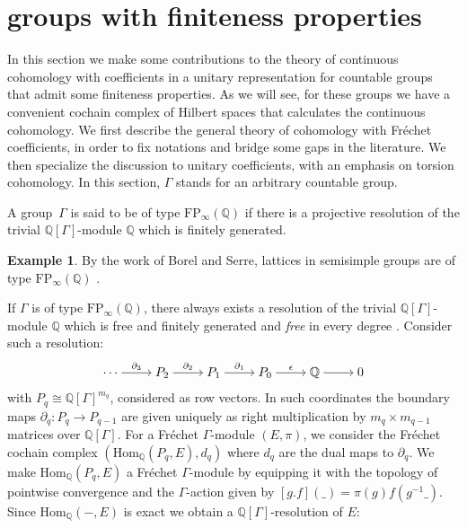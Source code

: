 \documentclass[12pt,reqno]{amsart}
\newcommand{\Q}{\mathbb{Q}}
\theoremstyle{definition}
\newtheorem{example}[theorem]{Example}
\begin{document}
\section{groups with finiteness properties}\label{sec3}
 In this section we make some contributions to the theory of continuous cohomology with coefficients in a unitary representation for countable groups that admit some finiteness properties. As we will see, for these groups we have a convenient cochain complex of Hilbert spaces that calculates the continuous cohomology. We first describe the general theory of cohomology with Fr\'echet coefficients, in order to fix notations and bridge some gaps in the literature. We then specialize the discussion to unitary coefficients, with an emphasis on torsion cohomology. In this section, $\Gamma$ stands for an arbitrary countable group.
 
    A group~$\Gamma$ is said to be of type $\mathrm{FP}_\infty(\mathbb{Q})$ if there is a projective resolution of the trivial $\mathbb{Q}[\Gamma]$-module $\mathbb{Q}$ which is finitely generated.


\begin{example}\label{ex:lattices finite type}
    By the work of Borel and Serre, lattices in semisimple groups are of type $\mathrm{FP_\infty(\Q)}$ \cite{borel+serre}. 
\end{example}

If $\Gamma$ is of type $\mathrm{FP}_\infty(\mathbb{Q})$, there always exists a resolution of the trivial $\mathbb{Q}[\Gamma]$-module $\mathbb{Q}$ which is free and finitely generated and \emph{free} in every degree \cite[Theorem~VIII.4.5]{Brown}. Consider such a resolution:
\[\begin{tikzcd}[cramped]
	\cdots & {P_2} & {P_1} & {P_0} & {\mathbb{Q}} & 0
	\arrow[ "{\partial_3}", from=1-1, to=1-2]
	\arrow["{\partial_2}", from=1-2, to=1-3]
	\arrow["{\partial_1}", from=1-3, to=1-4]
	\arrow["{\epsilon}", from=1-4, to=1-5]
	\arrow[from=1-5, to=1-6]
\end{tikzcd}\]
with $P_q \cong \mathbb{Q}[\Gamma]^{m_q}$, considered as row vectors. In such coordinates the boundary maps $\partial_q: P_q \rightarrow P_{q-1}$ are given uniquely as  right multiplication by $m_{q}\times m_{q-1}$ matrices over $\mathbb{Q}[\Gamma]$. For a Fr\'echet $\Gamma$-module $(E,\pi)$, we consider the Fr\'echet cochain complex $(\mathrm{Hom}_{\Q}(P_q,E),d_q)$ where $d_q$ are the dual maps to $\partial_q$. We make $\mathrm{Hom}_{\Q}(P_q,E)$ a Fr\'echet $\Gamma$-module by equipping it with the topology of pointwise convergence and the $\Gamma$-action given by $[g.f](\_) = \pi(g)f(g^{-1}\_)$. Since $\mathrm{Hom}_\Q(-,E)$ is exact we obtain a $\Q[\Gamma]$-resolution of $E$:
\end{document}
